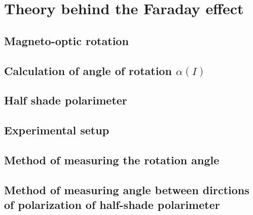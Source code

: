 \section{Theory behind the Faraday effect}

\subsection{Magneto-optic rotation}

\subsection{Calculation of angle of rotation $\alpha(I)$}

\subsection{Half shade polarimeter}

\subsection{Experimental setup}

\subsection{Method of measuring the rotation angle}

\subsection{Method of measuring angle between dirctions of polarization of half-shade polarimeter}
